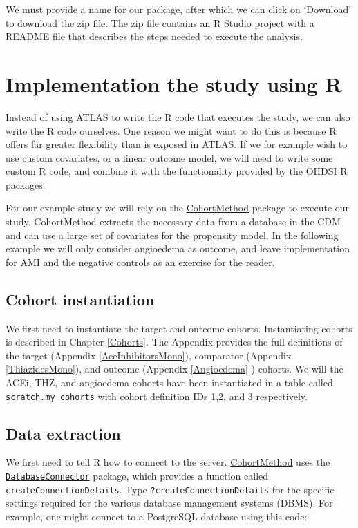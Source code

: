 \documentclass[]{book}
\begin{document}
We must provide a name for our package, after which we can click on
`Download' to download the zip file. The zip file contains an R Studio
project with a README file that describes the steps needed to execute
the analysis.

\section{Implementation the study using
R}\label{implementation-the-study-using-r}

Instead of using ATLAS to write the R code that executes the study, we
can also write the R code ourselves. One reason we might want to do this
is because R offers far greater flexibility than is exposed in ATLAS. If
we for example wish to use custom covariates, or a linear outcome model,
we will need to write some custom R code, and combine it with the
functionality provided by the OHDSI R packages.

For our example study we will rely on the
\href{https://ohdsi.github.io/CohortMethod/}{CohortMethod} package to
execute our study. CohortMethod extracts the necessary data from a
database in the CDM and can use a large set of covariates for the
propensity model. In the following example we will only consider
angioedema as outcome, and leave implementation for AMI and the negative
controls as an exercise for the reader.

\subsection{Cohort instantiation}\label{cohort-instantiation}

We first need to instantiate the target and outcome cohorts.
Instantiating cohorts is described in Chapter \ref{Cohorts}. The
Appendix provides the full definitions of the target (Appendix
\ref{AceInhibitorsMono}), comparator (Appendix \ref{ThiazidesMono}), and
outcome (Appendix \ref{Angioedema} ) cohorts. We will the ACEi, THZ, and
angioedema cohorts have been instantiated in a table called
\texttt{scratch.my\_cohorts} with cohort definition IDs 1,2, and 3
respectively.

\subsection{Data extraction}\label{data-extraction}

We first need to tell R how to connect to the server.
\href{https://ohdsi.github.io/CohortMethod/}{CohortMethod} uses the
\href{https://ohdsi.github.io/DatabaseConnector/}{\texttt{DatabaseConnector}}
package, which provides a function called
\texttt{createConnectionDetails}. Type \texttt{?createConnectionDetails}
for the specific settings required for the various database management
systems (DBMS). For example, one might connect to a PostgreSQL database
using this code:
\end{document}
